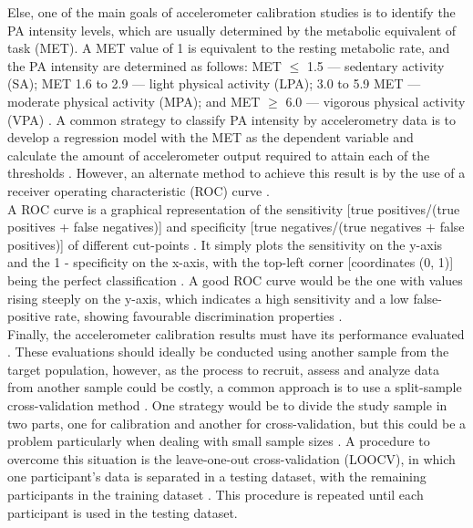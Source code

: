 \documentclass[11pt]{article}
\begin{document}
Else, one of the main goals of accelerometer calibration studies is to identify the PA intensity levels, which are usually determined by the metabolic equivalent of task (MET). A MET value of 1 is equivalent to the resting metabolic rate, and the PA intensity are determined as follows: MET $\leq$ 1.5 --- sedentary activity (SA); MET 1.6 to 2.9 --- light physical activity (LPA); 3.0 to 5.9 MET --- moderate physical activity (MPA); and MET $\geq$ 6.0 --- vigorous physical activity (VPA) \cite{Piercy_2018}. A common strategy to classify PA intensity by accelerometry data is to develop a regression model with the MET as the dependent variable and calculate the amount of accelerometer output required to attain each of the thresholds \cite{Jago_2007}. However, an alternate method to achieve this result is by the use of a receiver operating characteristic (ROC) curve \cite{Welk_2005, Jago_2007}. \\

A ROC curve is a graphical representation of the sensitivity [true positives/(true positives + false negatives)] and specificity [true negatives/(true negatives + false positives)] of different cut-points \cite{Welk_2005, Jago_2007}. It simply plots the sensitivity on the y-axis and the 1 - specificity on the x-axis, with the top-left corner [coordinates (0, 1)] being the perfect classification \cite{Welk_2005, Jago_2007}. A good ROC curve would be the one with values rising steeply on the y-axis, which indicates a high sensitivity and a low false-positive rate, showing favourable  discrimination properties \cite{Welk_2005}. \\

Finally, the accelerometer calibration results must have its performance evaluated \cite{Basset_2012}. These evaluations should ideally be conducted using another sample from the target population, however, as the process to recruit, assess and analyze data from another sample could be costly, a common approach is to use a split-sample cross-validation method \cite{Staudenmayer_2012}. One strategy would be to divide the study sample in two parts, one for calibration and another for cross-validation, but this could be a problem particularly when dealing with small sample sizes \cite{Staudenmayer_2012}. A procedure to overcome this situation is the leave-one-out cross-validation (LOOCV), in which one participant's data is separated in a testing dataset, with the remaining participants in the training dataset \cite{Staudenmayer_2012}. This procedure is repeated until each participant is used in the testing dataset.
\end{document}
